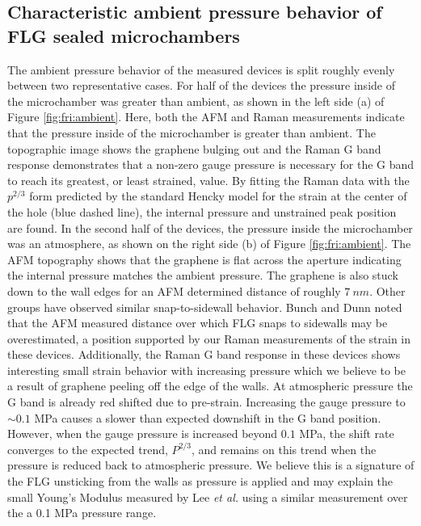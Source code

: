 \subsection{Characteristic ambient pressure behavior of FLG sealed microchambers}
The ambient pressure behavior of the measured devices is split roughly evenly between two representative cases.
For half of the devices the pressure inside of the microchamber was greater than ambient, as shown in the left side (a) of Figure \ref{fig:fri:ambient}.
Here, both the AFM and Raman measurements indicate that the pressure inside of the microchamber is greater than ambient.
The topographic image shows the graphene bulging out and the Raman G band response demonstrates that a non-zero gauge pressure is necessary for the G band to reach its greatest, or least strained, value.
By fitting the Raman data with the $p^{2/3}$ form predicted by the standard Hencky model for the strain at the center of the hole (blue dashed line), the internal pressure and unstrained peak position are found.
In the second half of the devices, the pressure inside the microchamber was an atmosphere, as shown on the right side (b) of Figure \ref{fig:fri:ambient}.
The AFM topography shows that the graphene is flat across the aperture indicating the internal pressure matches the ambient pressure.
The graphene is also stuck down to the wall edges for an AFM determined distance of roughly $7 \ nm$.
Other groups have observed similar snap-to-sidewall behavior\cite{Lee2008,Bunch2008}.
Bunch and Dunn noted that the AFM measured distance over which FLG snaps to sidewalls may be overestimated\cite{Bunch2012}, a position supported by our Raman measurements of the strain in these devices.
Additionally, the Raman G band response in these devices shows interesting small strain behavior with increasing pressure which we believe to be a result of graphene peeling off the edge of the walls.
At atmospheric pressure the G band is already red shifted due to pre-strain.
Increasing the gauge pressure to $\sim 0.1$ MPa causes a slower than expected downshift in the G band position.
However, when the gauge pressure is increased beyond $0.1$ MPa, the shift rate converges to the expected trend, $P^{2/3}$, and remains on this trend when the pressure is reduced back to atmospheric pressure.
We believe this is a signature of the FLG unsticking from the walls as pressure is applied and may explain the small Young's Modulus measured by Lee \emph{et al.} using a similar measurement over the a 0.1 MPa pressure range\cite{Lee2012}.

